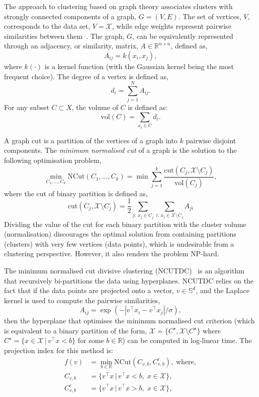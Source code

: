 \documentclass{book}
\def\R{\mathbb{R}}
\begin{document}
The approach to clustering based on graph theory associates clusters with strongly
connected components of a graph, $G = (V,E)$\/. The set of vertices, $V$, corresponds
to the data set, $V=\mathcal{X}$, while edge weights represent pairwise
similarities between them~\cite{Luxburg2007}.
%
The graph, $G$, can be equivalently represented through an adjacency, or similarity, matrix, $A \in
\R^{n \times n}$, defined as,
%
\begin{equation}\label{eq:A}
%
A_{ij} = k(x_i, x_j),
%
\end{equation}
%
where $k(\cdot)$ is a kernel function (with the Gaussian kernel being the most frequent choice).
%
The degree of a vertex is defined as,
%
\[ d_i = \sum_{j=1}^N A_{ij}.\]
%
%
For any subset $C \subset X$, 
%
the volume of $C$ is defined as:
%
\[ \textrm{vol}(C) = \sum_{x_i \in C} d_i.\]


A graph cut is a partition of the vertices of a graph into $k$ pairwise
disjoint components. The \emph{minimum normalised cut} of a graph is the
solution to the following optimisation problem,
%
\begin{equation}\label{eq:ncut}
%
\min_{C_1,\ldots, C_k} \textrm{NCut}(C_1,\ldots,C_k) = \min \sum_{j=1}^k \frac{\mathrm{cut}\left(C_j, \mathcal{X} \setminus
C_j \right)}{\textrm{vol}(C_j)}, 
%
\end{equation}
%
where the cut of binary partition is defined as,
%
\begin{equation*}
\textrm{cut}\left(C_j, \mathcal{X} \setminus C_j \right) = \frac{1}{2} 
\sum_{j:\, x_j \in C_j} \sum_{i:\, x_i \in \mathcal{X} \setminus C_j} A_{ji}
%
\end{equation*}
%
Dividing the value of the cut for each binary partition
with the cluster volume
(normalisation) discourages the optimal
solution from containing partitions (clusters) with very few vertices (data points), which
is undesirable from a clustering perspective.
%
However, it also renders the problem NP-hard.


The minimum normalised cut divisive clustering
(NCUTDC)~\cite{Hofmeyr2017} is an algorithm that recursively bi-partitions
the data using hyperplanes. 
%
NCUTDC relies on the fact that if the data points are projected onto a vector, $v \in \mathbb{S}^d$,
and the Laplace kernel is used to compute the pairwise similarities, 
%
\[A_{ij} = \exp\left( -\left|v^\top x_i - v^\top x_j\right|/\sigma \right), \]
%
then the hyperplane that optimises the minimum normalised cut criterion
(which is equivalent to a binary partition of the form,
$\mathcal{X} = \{C^\star, \mathcal{X}\setminus C^\star\}$ where
$C^\star = \{x \in \mathcal{X} \,|\, v^\top x < b\}$ for some $b \in \R$)
%
can be computed in log-linear time.
%
The projection index for this method is:
%
\begin{align*}
%
f(v) & = \min_{b \in \R} \mathrm{NCut}\left( C_{v,b},  C_{v,b}^c \right), \;
\textrm{where},\\
%
C_{v,b} & = \{ v^\top x \,|\, v^\top x < b, \; x \in \mathcal{X}\}, \\
%
C^c_{v,b} & = \{ v^\top x \,|\, v^\top x > b,\; x \in \mathcal{X}\}, \\
%
\end{align*}
\end{document}

